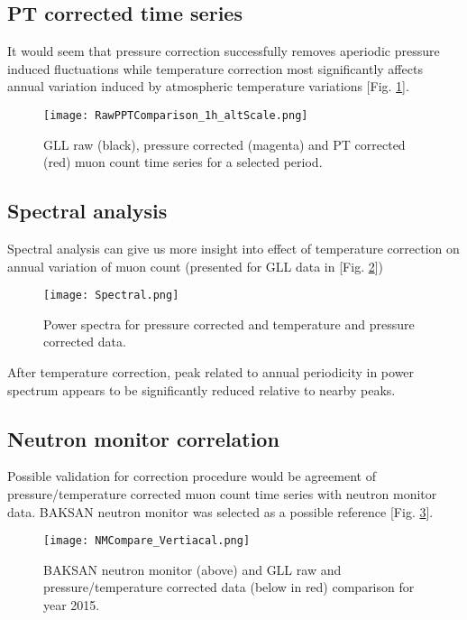 \documentclass[twocolumn,twoside,slac_two]{revtex4}
\begin{document}
\subsection{PT corrected time series}

It would seem that pressure correction successfully removes aperiodic pressure induced 
fluctuations while temperature correction most significantly affects annual variation induced by atmospheric temperature variations [Fig. \ref{PT_TimeSeries}].

\begin{figure}[h]
\centering
\texttt{[image: RawPPTComparison\_1h\_altScale.png]}
\caption{GLL raw (black), pressure corrected (magenta) and PT corrected (red) muon count time series for a selected period.} 
\label{PT_TimeSeries}
\end{figure}



\subsection{Spectral analysis}
Spectral analysis can give us more insight into effect of temperature correction on annual variation of muon count (presented for GLL data in [Fig. \ref{Spectral}])

\begin{figure}[h]
\centering
\texttt{[image: Spectral.png]}
\caption{Power spectra for pressure corrected and temperature and pressure corrected data.} 
\label{Spectral}
\end{figure}

After temperature correction, peak related to annual periodicity in power spectrum appears to be significantly reduced relative to nearby peaks.


\subsection{Neutron monitor correlation}
Possible validation for correction procedure would be agreement of pressure/temperature 
corrected muon count time series with neutron monitor data. BAKSAN neutron monitor was 
selected as a possible reference [Fig. \ref{NM_Compare}].

\begin{figure}[h]
\centering
\texttt{[image: NMCompare\_Vertiacal.png]}
\caption{BAKSAN neutron monitor (above) and GLL raw and pressure/temperature corrected data (below in red) comparison for year 2015.} 
\label{NM_Compare}
\end{figure}
\end{document}
